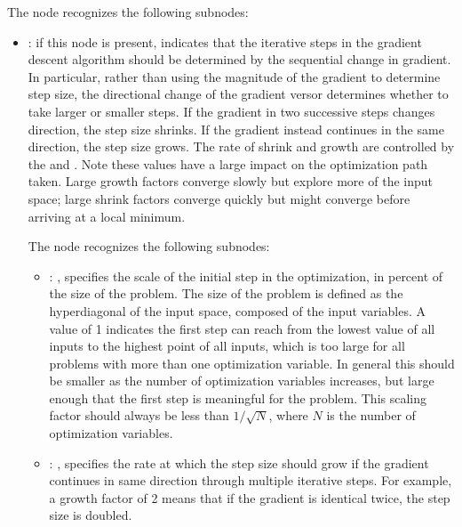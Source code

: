 \begin{itemize}
      The  node recognizes the following subnodes:
      \begin{itemize}
        \item {}:
          if this node is present, indicates that the iterative steps in the gradient
          descent algorithm should be determined by the sequential change in gradient. In
          particular, rather         than using the magnitude of the gradient to determine step
          size, the directional change of the         gradient versor determines whether to take
          larger or smaller steps. If the gradient in two successive         steps changes
          direction, the step size shrinks. If the gradient instead continues in the same
          direction, the step size grows. The rate of shrink and growth are controlled by the
                   and . Note these values have a large
          impact on the optimization path taken.         Large growth factors converge slowly but
          explore more of the input space; large shrink factors         converge quickly but might
          converge before arriving at a local minimum.

          The  node recognizes the following subnodes:
          \begin{itemize}
            \item {}: ,
              specifies the scale of the initial step in the optimization, in percent of the
              size of the problem. The size of the problem is defined as the hyperdiagonal of the
              input space, composed of the input variables. A value of 1 indicates the first step
              can reach from the lowest value of all inputs to the highest point of all inputs,
              which is too large for all problems with more than one optimization variable. In
              general this               should be smaller as the number of optimization variables
              increases, but large enough               that the first step is meaningful for the
              problem. This scaling factor should always               be less than $1/\sqrt{N}$,
              where $N$ is the number of optimization variables. 

            \item {}: ,
              specifies the rate at which the step size should grow if the gradient continues in
              same direction through multiple iterative steps. For example, a growth factor of 2
              means               that if the gradient is identical twice, the step size is doubled.


\end{itemize}
\end{itemize}
\end{itemize}
